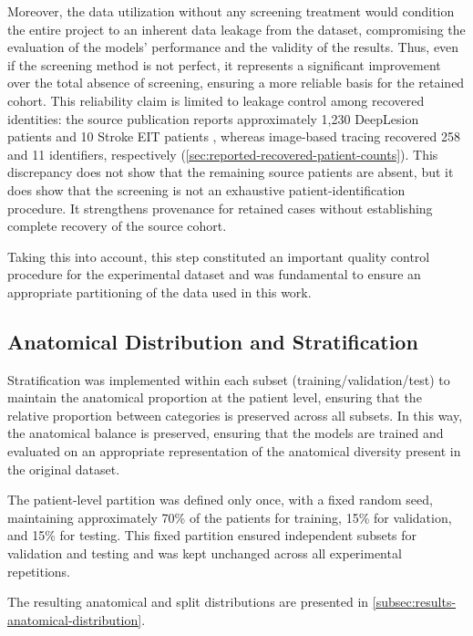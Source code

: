 Moreover, the data utilization without any screening treatment would condition the entire project to an inherent data leakage from the dataset, compromising the evaluation of the models' performance and the validity of the results. Thus, even if the screening method is not perfect, it represents a significant improvement over the total absence of screening, ensuring a more reliable basis for the retained cohort. This reliability claim is limited to leakage control among recovered identities: the source publication reports approximately 1,230 DeepLesion patients and 10 Stroke EIT patients \cite{hanedaAAPMCTMetal2025}, whereas image-based tracing recovered 258 and 11 identifiers, respectively (\autoref{sec:reported-recovered-patient-counts}). This discrepancy does not show that the remaining source patients are absent, but it does show that the screening is not an exhaustive patient-identification procedure. It strengthens provenance for retained cases without establishing complete recovery of the source cohort.

Taking this into account, this step constituted an important quality control procedure for the experimental dataset and was fundamental to ensure an appropriate partitioning of the data used in this work.


\subsection{Anatomical Distribution and Stratification}

Stratification was implemented within each subset (training/validation/test) to maintain the anatomical proportion at the patient level, ensuring that the relative proportion between categories is preserved across all subsets. In this way, the anatomical balance is preserved, ensuring that the models are trained and evaluated on an appropriate representation of the anatomical diversity present in the original dataset.

The patient-level partition was defined only once, with a fixed random seed, maintaining approximately 70\% of the patients for training, 15\% for validation, and 15\% for testing. This fixed partition ensured independent subsets for validation and testing and was kept unchanged across all experimental repetitions.

The resulting anatomical and split distributions are presented in \autoref{subsec:results-anatomical-distribution}.
